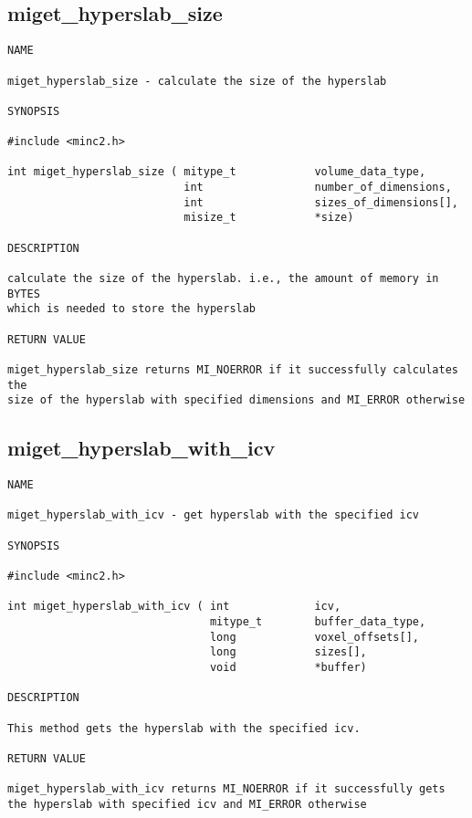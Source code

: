 \documentclass{article}
\begin{document}
\subsection{miget\_hyperslab\_size}
\begin{verbatim}
NAME

miget_hyperslab_size - calculate the size of the hyperslab

SYNOPSIS

#include <minc2.h>

int miget_hyperslab_size ( mitype_t            volume_data_type,
                           int                 number_of_dimensions,
                           int                 sizes_of_dimensions[],
                           misize_t            *size)

DESCRIPTION

calculate the size of the hyperslab. i.e., the amount of memory in BYTES
which is needed to store the hyperslab

RETURN VALUE

miget_hyperslab_size returns MI_NOERROR if it successfully calculates the
size of the hyperslab with specified dimensions and MI_ERROR otherwise
\end{verbatim}

\subsection{miget\_hyperslab\_with\_icv}
\begin{verbatim}
NAME

miget_hyperslab_with_icv - get hyperslab with the specified icv

SYNOPSIS

#include <minc2.h>

int miget_hyperslab_with_icv ( int             icv,
                               mitype_t        buffer_data_type,
                               long            voxel_offsets[],
                               long            sizes[],
                               void            *buffer)                
                                        
DESCRIPTION

This method gets the hyperslab with the specified icv.

RETURN VALUE

miget_hyperslab_with_icv returns MI_NOERROR if it successfully gets
the hyperslab with specified icv and MI_ERROR otherwise
\end{verbatim}
\end{document}
